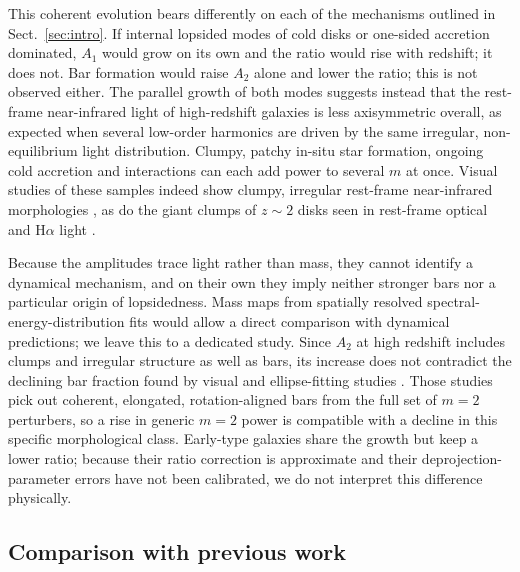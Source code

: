\documentclass[fleqn,usenatbib]{mnras}
\begin{document}
This coherent evolution bears differently on each of the mechanisms outlined
in Sect.~\ref{sec:intro}. If internal lopsided modes of cold disks
\citep{Jog1997,Saha2007,2011Ap.....54..184M,2025A&AT...35..215O,2024AstBu..79..221M} or one-sided accretion
\citep{Bournaud2005,Dekel2009} dominated, $A_1$ would grow on its own and the
ratio would rise with redshift; it does not. Bar formation
\citep{Athanassoula2003,Debattista2000} would raise $A_2$ alone and lower the
ratio; this is not observed either. The parallel growth of both modes suggests
instead that the rest-frame near-infrared light of high-redshift galaxies is less
axisymmetric overall, as expected when several low-order harmonics are driven by
the same irregular, non-equilibrium light distribution. Clumpy, patchy in-situ
star formation, ongoing cold accretion and interactions can each add power to
several $m$ at once. Visual studies of these samples indeed show clumpy,
irregular rest-frame near-infrared morphologies
\citep{Ferreira2022,Kartaltepe2023}, as do the giant clumps of $z\sim2$ disks
seen in rest-frame optical and H$\alpha$ light \citep{Elmegreen2007,Genzel2011}.

Because the amplitudes trace light rather than mass, they cannot identify a
dynamical mechanism, and on their own they imply neither stronger bars nor a
particular origin of lopsidedness. Mass maps from spatially resolved
spectral-energy-distribution fits \citep{Jacobs2023,Nelson2024} would allow a
direct comparison with dynamical predictions; we leave this to a dedicated study.
Since $A_2$ at high redshift includes clumps and irregular structure as well as
bars, its increase does not contradict the declining bar fraction found by visual
and ellipse-fitting studies \citep{Guo2025,LeConte2024}. Those studies pick out
coherent, elongated, rotation-aligned bars from the full set of $m=2$ perturbers,
so a rise in generic $m=2$ power is compatible with a decline in this specific
morphological class. Early-type galaxies share the growth but keep a lower
ratio; because their ratio correction is approximate and their
deprojection-parameter errors have not been calibrated, we do not interpret this
difference physically.

\subsection{Comparison with previous work}\label{sec:previouswork}
\end{document}
